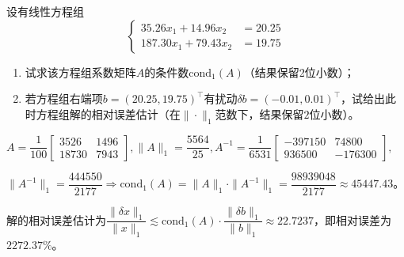     \begin{homework}[6+4pts]
        设有线性方程组
            \[\begin{cases}35.26x_1+14.96x_2&=20.25\\187.30x_1+79.43x_2&=19.75\end{cases}\]
        \begin{enumerate}
            \item 试求该方程组系数矩阵$A$的条件数$\mathrm{cond}_1(A)$（结果保留2位小数）；
            \item 若方程组右端项$b=(20.25,19.75)^{\top}$有扰动$\delta b=(-0.01,0.01)^{\top}$，试给出此时方程组解的相对误差估计（在$\|\cdot\|_1$范数下，结果保留$2$位小数）。
        \end{enumerate}
    \end{homework}

    \begin{solution}
        $A=\dfrac1{100}\begin{bmatrix}3526&1496\\18730&7943\end{bmatrix},\|A\|_1=\dfrac{5564}{25},A^{-1}=\dfrac1{6531}\begin{bmatrix}-397150&74800\\936500&-176300\end{bmatrix},$

        $\|A^{-1}\|_1=\dfrac{444550}{2177}\Rightarrow \mathrm{cond}_1(A)=\|A\|_1\cdot\|A^{-1}\|_1=\dfrac{98939048}{2177}\approx 45447.43$。

        解的相对误差估计为$\dfrac{\|\delta x\|_1}{\|x\|_1}\lesssim\mathrm{cond}_1(A)\cdot\dfrac{\|\delta b\|_1}{\|b\|_1}\approx 22.7237$，即相对误差为$2272.37\%$。
    \end{solution}

